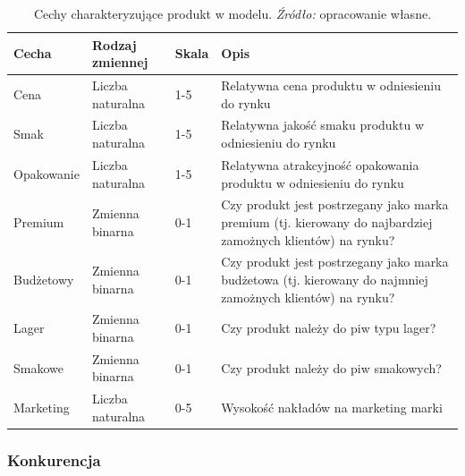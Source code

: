\documentclass[polish, twoside, 12pt, a4paper]{article}
\theoremstyle{definition}
\theoremstyle{plain}
\theoremstyle{remark}
\begin{document}
\begin{table}[hbt]
  \centering
  \captionsetup{margin=10pt,font=small,labelfont=bf,width=.8\textwidth}
  \caption[Cechy charakteryzujące produkt w modelu]{Cechy charakteryzujące produkt w modelu. \textit{Źródło:} opracowanie własne.}
  \label{tab:cechyproduktu}
\vspace*{2ex}
\begin{tabular}{llll}
\hline
Cecha      & Rodzaj zmiennej  & Skala & Opis                                                                                                        \\ \hline
Cena       & Liczba naturalna & 1-5   & Relatywna cena produktu w odniesieniu do rynku                                                              \\
Smak       & Liczba naturalna & 1-5   & Relatywna jakość smaku produktu w odniesieniu do rynku                                                      \\
Opakowanie & Liczba naturalna & 1-5   & Relatywna atrakcyjność opakowania produktu w odniesieniu do rynku                                           \\
Premium    & Zmienna binarna  & 0-1   & Czy produkt jest postrzegany jako marka premium (tj. kierowany do najbardziej zamożnych klientów) na rynku? \\
Budżetowy  & Zmienna binarna  & 0-1   & Czy produkt jest postrzegany jako marka budżetowa (tj. kierowany do najmniej zamożnych klientów) na rynku?  \\
Lager      & Zmienna binarna  & 0-1   & Czy produkt należy do piw typu lager?                                                                       \\
Smakowe    & Zmienna binarna  & 0-1   & Czy produkt należy do piw smakowych?                                                                        \\
Marketing  & Liczba naturalna & 0-5   & Wysokość nakładów na marketing marki                                                                        \\ \hline
\end{tabular}
\end{table}

\subsubsection{Konkurencja}
 
\end{document}
